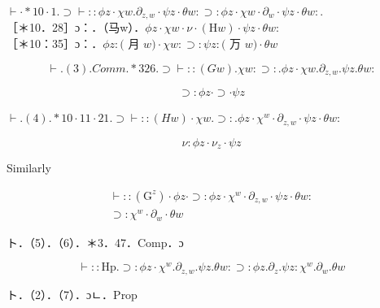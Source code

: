 \documentclass[10pt]{article}
\begin{document}
$\vdash \cdot * 10 \cdot 1 . \supset \vdash:: \phi z \cdot \chi w . \partial_{z, w} \cdot \psi z \cdot \theta w: \supset: \phi z \cdot \chi w \cdot \partial_{w} \cdot \psi z \cdot \theta w:$.\\
［＊10．28］ɔ：．（马w）．$\phi z \cdot \chi w \cdot \nu \cdot(\mathrm{H} w) \cdot \psi z \cdot \theta w:$\\
［＊10：35］ɔ：．$\phi z:($ 月 $w) \cdot \chi w: \supset: \psi z:($ 万 $w) \cdot \theta w$


\begin{equation*}
\vdash .(3) . C o m m . * 326 . \supset \vdash::(G w) . \chi w: \supset: . \phi z \cdot \chi w . \partial_{z, w} . \psi z . \theta w: \tag{3}
\end{equation*}



\begin{equation*}
\supset: \phi z \cdot \supset \cdot \psi z \tag{4}
\end{equation*}


$\vdash .(4) . * 10 \cdot 11 \cdot 21 . \supset \vdash::(H w) \cdot \chi w . \supset: . \phi z \cdot \chi^{w} \cdot \partial_{z, w} \cdot \psi z \cdot \theta w:$


\begin{equation*}
\nu: \phi z \cdot \nu_{z} \cdot \psi z \tag{5}
\end{equation*}


Similarly

\[
\begin{array}{r}
\vdash::\left(\mathrm{G}^{z}\right) \cdot \phi z \cdot \supset: \phi z \cdot \chi^{w} \cdot \partial_{z, w} \cdot \psi z \cdot \theta w: \\
\supset: \chi^{w} \cdot \partial_{w} \cdot \theta w \tag{6}
\end{array}
\]

ト．（5）．（6）．＊3．47．Comp．ɔ


\begin{equation*}
\vdash:: \mathrm{Hp} . \supset: \phi z \cdot \chi^{w} . \partial_{z, w} . \psi z . \theta w: \supset: \phi z . \partial_{z} . \psi z: \chi^{w} . \partial_{w} . \theta w \tag{7}
\end{equation*}


ト．（2）．（7）．ɔㄴ．Prop
\end{document}
